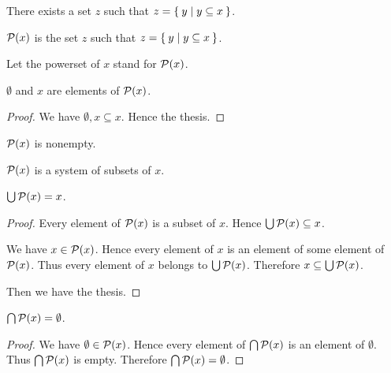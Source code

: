 \documentclass[../../set-theory.ftl.tex]{subfiles}
\begin{document}
  \begin{forthel}
    \begin{axiom}[Powerset]\label{SetTheory_01_02_516997}
      There exists a set $z$ such that $z = \Set{y | y \subseteq x}$.
    \end{axiom}

    \begin{definition}
      $\mathcal{P}(x)$ is the set $z$ such that $z = \Set{y | y \subseteq x}$.
    \end{definition}

    Let the powerset of $x$ stand for $\mathcal{P}(x)$.

    \begin{proposition}\label{SetTheory_01_02_481481}
      $\emptyset$ and $x$ are elements of $\mathcal{P}(x)$.
    \end{proposition}
    \begin{proof}
      We have $\emptyset, x \subseteq x$.
      Hence the thesis.
    \end{proof}

    \begin{corollary}\label{SetTheory_01_02_671341}
      $\mathcal{P}(x)$ is nonempty.
    \end{corollary}

    \begin{proposition}\label{SetTheory_01_02_833606}
      $\mathcal{P}(x)$ is a system of subsets of $x$.
    \end{proposition}

    \begin{proposition}\label{SetTheory_01_02_706547}
      $\bigcup \mathcal{P}(x) = x$.
    \end{proposition}
    \begin{proof}
      Every element of $\mathcal{P}(x)$ is a subset of $x$.
      Hence $\bigcup \mathcal{P}(x) \subseteq x$.

      We have $x \in \mathcal{P}(x)$.
      Hence every element of $x$ is an element of some element of $\mathcal{P}(x)$.
      Thus every element of $x$ belongs to $\bigcup \mathcal{P}(x)$.
      Therefore $x \subseteq \bigcup \mathcal{P}(x)$.

      Then we have the thesis.
    \end{proof}

    \begin{proposition}\label{SetTheory_01_02_818609}
      $\bigcap \mathcal{P}(x) = \emptyset$.
    \end{proposition}
    \begin{proof}
      We have $\emptyset \in \mathcal{P}(x)$.
      Hence every element of $\bigcap \mathcal{P}(x)$ is an element of $\emptyset$.
      Thus $\bigcap \mathcal{P}(x)$ is empty.
      Therefore $\bigcap \mathcal{P}(x) = \emptyset$.
    \end{proof}
  \end{forthel}
\end{document}
